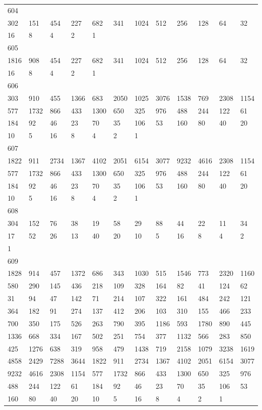 \begin{longtable}{llllllllllll}
604&&&&&&&&&&&\\
302& 151& 454& 227& 682& 341& 1024& 512& 256& 128& 64& 32\\
16& 8& 4& 2& 1& \\

605&&&&&&&&&&&\\
1816& 908& 454& 227& 682& 341& 1024& 512& 256& 128& 64& 32\\
16& 8& 4& 2& 1& \\

606&&&&&&&&&&&\\
303& 910& 455& 1366& 683& 2050& 1025& 3076& 1538& 769& 2308& 1154\\
577& 1732& 866& 433& 1300& 650& 325& 976& 488& 244& 122& 61\\
184& 92& 46& 23& 70& 35& 106& 53& 160& 80& 40& 20\\
10& 5& 16& 8& 4& 2& 1& \\

607&&&&&&&&&&&\\
1822& 911& 2734& 1367& 4102& 2051& 6154& 3077& 9232& 4616& 2308& 1154\\
577& 1732& 866& 433& 1300& 650& 325& 976& 488& 244& 122& 61\\
184& 92& 46& 23& 70& 35& 106& 53& 160& 80& 40& 20\\
10& 5& 16& 8& 4& 2& 1& \\

608&&&&&&&&&&&\\
304& 152& 76& 38& 19& 58& 29& 88& 44& 22& 11& 34\\
17& 52& 26& 13& 40& 20& 10& 5& 16& 8& 4& 2\\
1& \\

609&&&&&&&&&&&\\
1828& 914& 457& 1372& 686& 343& 1030& 515& 1546& 773& 2320& 1160\\
580& 290& 145& 436& 218& 109& 328& 164& 82& 41& 124& 62\\
31& 94& 47& 142& 71& 214& 107& 322& 161& 484& 242& 121\\
364& 182& 91& 274& 137& 412& 206& 103& 310& 155& 466& 233\\
700& 350& 175& 526& 263& 790& 395& 1186& 593& 1780& 890& 445\\
1336& 668& 334& 167& 502& 251& 754& 377& 1132& 566& 283& 850\\
425& 1276& 638& 319& 958& 479& 1438& 719& 2158& 1079& 3238& 1619\\
4858& 2429& 7288& 3644& 1822& 911& 2734& 1367& 4102& 2051& 6154& 3077\\
9232& 4616& 2308& 1154& 577& 1732& 866& 433& 1300& 650& 325& 976\\
488& 244& 122& 61& 184& 92& 46& 23& 70& 35& 106& 53\\
160& 80& 40& 20& 10& 5& 16& 8& 4& 2& 1& \\


\end{longtable}
